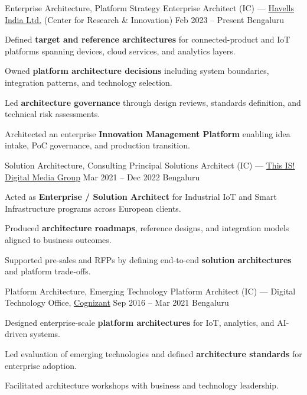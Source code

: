 \documentclass[11pt, a4paper]{awesome-cv}
\begin{document}
\begin{cventries}

\cventry
  {Enterprise Architecture, Platform Strategy}
  {Enterprise Architect (IC) — \underline{Havells India Ltd.} (Center for Research \& Innovation)}
  {Feb 2023 – Present}
  {Bengaluru}
  {
    \begin{cvitems}
      \item {Defined \textbf{target and reference architectures} for connected-product and IoT platforms spanning devices, cloud services, and analytics layers.}
      \item {Owned \textbf{platform architecture decisions} including system boundaries, integration patterns, and technology selection.}
      \item {Led \textbf{architecture governance} through design reviews, standards definition, and technical risk assessments.}
      \item {Architected an enterprise \textbf{Innovation Management Platform} enabling idea intake, PoC governance, and production transition.}
    \end{cvitems}
  }

\cventry
  {Solution Architecture, Consulting}
  {Principal Solutions Architect (IC) — \underline{This IS! Digital Media Group}}
  {Mar 2021 – Dec 2022}
  {Bengaluru}
  {
    \begin{cvitems}
      \item {Acted as \textbf{Enterprise / Solution Architect} for Industrial IoT and Smart Infrastructure programs across European clients.}
      \item {Produced \textbf{architecture roadmaps}, reference designs, and integration models aligned to business outcomes.}
      \item {Supported pre-sales and RFPs by defining end-to-end \textbf{solution architectures} and platform trade-offs.}
    \end{cvitems}
  }

\cventry
  {Platform Architecture, Emerging Technology}
  {Platform Architect (IC) — Digital Technology Office, \underline{Cognizant}}
  {Sep 2016 – Mar 2021}
  {Bengaluru}
  {
    \begin{cvitems}
      \item {Designed enterprise-scale \textbf{platform architectures} for IoT, analytics, and AI-driven systems.}
      \item {Led evaluation of emerging technologies and defined \textbf{architecture standards} for enterprise adoption.}
      \item {Facilitated architecture workshops with business and technology leadership.}
    \end{cvitems}
  }

\end{cventries}
\end{document}
